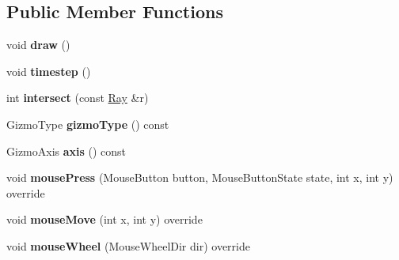 \subsection*{Public Member Functions}
\begin{DoxyCompactItemize}
\item 
\hypertarget{classps_1_1scene_1_1GizmoManager_ae6f98a5b2b93b0e95521f374435bf8aa}{}void {\bfseries draw} ()\label{classps_1_1scene_1_1GizmoManager_ae6f98a5b2b93b0e95521f374435bf8aa}

\item 
\hypertarget{classps_1_1scene_1_1GizmoManager_ae01a4723af3246cf01baeb89b9a9d795}{}void {\bfseries timestep} ()\label{classps_1_1scene_1_1GizmoManager_ae01a4723af3246cf01baeb89b9a9d795}

\item 
\hypertarget{classps_1_1scene_1_1GizmoManager_afa9e28718b8b2798508fea0094513960}{}int {\bfseries intersect} (const \hyperlink{classps_1_1base_1_1Ray}{Ray} \&r)\label{classps_1_1scene_1_1GizmoManager_afa9e28718b8b2798508fea0094513960}

\item 
\hypertarget{classps_1_1scene_1_1GizmoManager_a1a6169a881b5e8f7ee418fe9d0cc88a5}{}Gizmo\+Type {\bfseries gizmo\+Type} () const \label{classps_1_1scene_1_1GizmoManager_a1a6169a881b5e8f7ee418fe9d0cc88a5}

\item 
\hypertarget{classps_1_1scene_1_1GizmoManager_abeccebb9b0de86365d133a3e1f729b16}{}Gizmo\+Axis {\bfseries axis} () const \label{classps_1_1scene_1_1GizmoManager_abeccebb9b0de86365d133a3e1f729b16}

\item 
\hypertarget{classps_1_1scene_1_1GizmoManager_a593619fdba423decc8f54d33006fc54a}{}void {\bfseries mouse\+Press} (Mouse\+Button button, Mouse\+Button\+State state, int x, int y) override\label{classps_1_1scene_1_1GizmoManager_a593619fdba423decc8f54d33006fc54a}

\item 
\hypertarget{classps_1_1scene_1_1GizmoManager_af9e7d29589c8cda82f82f1918cfce53d}{}void {\bfseries mouse\+Move} (int x, int y) override\label{classps_1_1scene_1_1GizmoManager_af9e7d29589c8cda82f82f1918cfce53d}

\item 
\hypertarget{classps_1_1scene_1_1GizmoManager_a221c85a888ea684fdfff493a83171e6e}{}void {\bfseries mouse\+Wheel} (Mouse\+Wheel\+Dir dir) override\label{classps_1_1scene_1_1GizmoManager_a221c85a888ea684fdfff493a83171e6e}


\end{DoxyCompactItemize}
